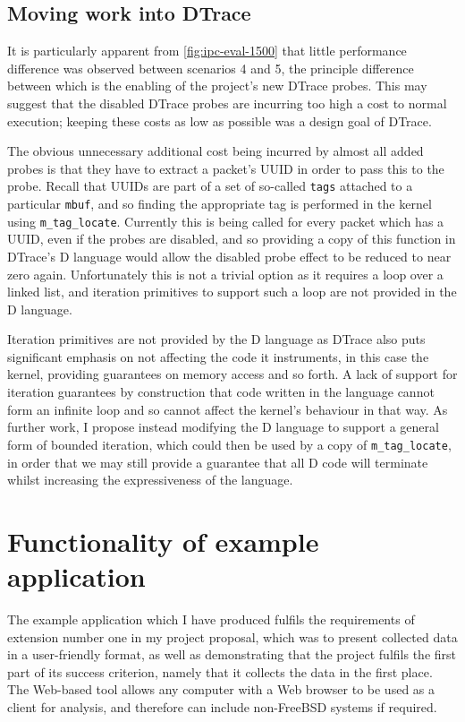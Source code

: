 \documentclass[a4paper,12pt,twoside,openright]{report}
\begin{document}
	\subsection{Moving work into DTrace}
	\label{sec:dtrace-iteration}
	
	It is particularly apparent from \figurename{ \ref{fig:ipc-eval-1500}} that little performance difference was observed between scenarios 4 and 5, the principle difference between which is the enabling of the project's new DTrace probes. This may suggest that the disabled DTrace probes are incurring too high a cost to normal execution; keeping these costs as low as possible was a design goal of DTrace\cite{Gregg-DTrace}.
	
	The obvious unnecessary additional cost being incurred by almost all added probes is that they have to extract a packet's UUID in order to pass this to the probe. Recall that UUIDs are part of a set of so-called \texttt{tags} attached to a particular \verb|mbuf|, and so finding the appropriate tag is performed in the kernel using \verb|m_tag_locate|. Currently this is being called for every packet which has a UUID, even if the probes are disabled, and so providing a copy of this function in DTrace's D language would allow the disabled probe effect to be reduced to near zero again. Unfortunately this is not a trivial option as it requires a loop over a linked list, and iteration primitives to support such a loop are not provided in the D language.
	
	Iteration primitives are not provided by the D language as DTrace also puts significant emphasis on not affecting the code it instruments, in this case the kernel, providing guarantees on memory access and so forth. A lack of support for iteration guarantees by construction that code written in the language cannot form an infinite loop and so cannot affect the kernel's behaviour in that way. As further work, I propose instead modifying the D language to support a general form of bounded iteration, which could then be used by a copy of \verb|m_tag_locate|, in order that we may still provide a guarantee that all D code will terminate whilst increasing the expressiveness of the language.
	
	\section{Functionality of example application}
	
	The example application which I have produced fulfils the requirements of extension number one in my project proposal, which was to present collected data in a user-friendly format, as well as demonstrating that the project fulfils the first part of its success criterion, namely that it collects the data in the first place. The Web-based tool allows any computer with a Web browser to be used as a client for analysis, and therefore can include non-FreeBSD systems if required.
	
\end{document}
